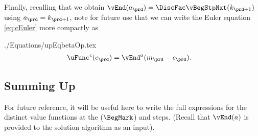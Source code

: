 \documentclass[SolvingMicroDSOPs]{subfiles}
\begin{document}
Finally, recalling that we obtain $\vEnd({a}_{\prd}) = \DiscFac \vBegStpNxt({k}_{\prd+1})$ using ${a}_{\prd} = {k}_{\prd+1}$, note for future use that we can write the Euler equation \eqref{eq:cEuler} more compactly as
\begin{verbatimwrite}{./Equations/upEqbetaOp.tex}
  \begin{equation}\begin{gathered}\begin{aligned}
        \uFunc^{{c}}({c}_{\prd})   & = \vEnd^{{a}}({m}_{\prd}-{c}_{\prd}).
        \label{eq:upEqbetaOp}
      \end{aligned}\end{gathered}\end{equation}
\end{verbatimwrite}
\unskip


\hypertarget{summing-up}{}
\subsection{Summing Up}\label{subsec:summing-up}
For future reference, it will be useful here to write the full expressions for the distinct value functions at the {\Arrival} ($\BegMark$) and {\Decision} steps.  (Recall that $\vEnd(a)$ is provided to the solution algorithm as an input).
\end{document}
